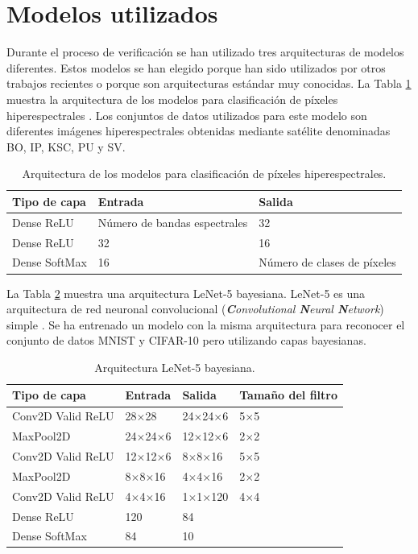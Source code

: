 \section{Modelos utilizados}

Durante el proceso de verificación se han utilizado tres arquitecturas de modelos diferentes. Estos modelos se han elegido porque han sido utilizados por otros trabajos recientes o porque son arquitecturas estándar muy conocidas. La Tabla \ref{tab:hyper_models} muestra la arquitectura de los modelos para clasificación de píxeles hiperespectrales \cite{bnn_hyper_uncertainty}. Los conjuntos de datos utilizados para este modelo son diferentes imágenes hiperespectrales obtenidas mediante satélite denominadas BO, IP, KSC, PU y SV.


\begin{table}[H]
	\centering
	\caption{Arquitectura de los modelos para clasificación de píxeles hiperespectrales.}
	\label{tab:hyper_models}
	\begin{tabular}{lll}
	\hline
     	\textbf{Tipo de capa} & \textbf{Entrada} & \textbf{Salida}\\ \hline
     	Dense ReLU& Número de bandas espectrales & 32\\
     	Dense ReLU& 32 & 16\\
     	Dense SoftMax& 16 & Número de clases de píxeles\\ \hline
	\end{tabular}
\end{table}

La Tabla \ref{tab:cnn_models} muestra una arquitectura LeNet-5 bayesiana. LeNet-5 es una arquitectura de red neuronal convolucional (\textit{\textbf{C}onvolutional \textbf{N}eural \textbf{N}etwork}) simple \cite{lenet}. Se ha entrenado un modelo con la misma arquitectura para reconocer el conjunto de datos MNIST \cite{MNIST_dataset} y CIFAR-10 \cite{CIFAR_dataset} pero utilizando capas bayesianas.

\begin{table}[H]
	\centering
	\caption{Arquitectura LeNet-5 bayesiana.}
	\label{tab:cnn_models}
	\begin{tabular}{llll}
    	\hline
     	\textbf{Tipo de capa} &  \textbf{Entrada} &  \textbf{Salida} & \textbf{Tamaño del filtro} \\ \hline
     	Conv2D Valid ReLU& 28$\times$28 & 24$\times$24$\times$6 & 5$\times$5 \\
     	MaxPool2D & 24$\times$24$\times$6 & 12$\times$12$\times$6 & 2$\times$2 \\
     	Conv2D Valid  ReLU& 12$\times$12$\times$6 & 8$\times$8$\times$16 & 5$\times$5 \\
     	MaxPool2D & 8$\times$8$\times$16 & 4$\times$4$\times$16 & 2$\times$2 \\
     	Conv2D Valid  ReLU& 4$\times$4$\times$16 & 1$\times$1$\times$120 & 4$\times$4 \\
     	Dense ReLU& 120 & 84 & \\
     	Dense SoftMax& 84 & 10 & \\ \hline
	\end{tabular}
\end{table}

